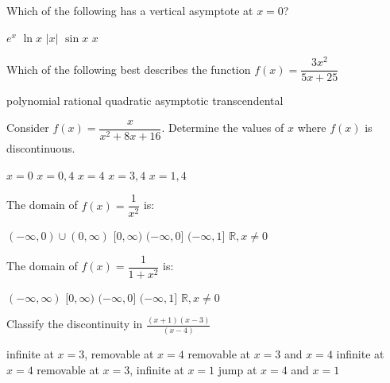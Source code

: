 \documentclass[legalpaper, 12pt, addpoints]{exam}
\begin{document}
\begin{questions}
\question Which of the following has a vertical asymptote at $x=0$? 
\begin{choices}
        \choice  $e^x$
        \CorrectChoice $\ln{x}$
        \choice $|x|$
        \choice $\sin{x}$
        \choice ${x}$
 \end{choices}
\vspace{0.1in}

\question Which of the following best describes the function $f(x) = \dfrac{3x^2}{5x+25}$
    \begin{choices}
         \choice polynomial
         \CorrectChoice rational
         \choice quadratic
         \choice asymptotic
         \choice transcendental
    \end{choices}
    
\vspace{0.10in}

\question Consider \(f(x) = \dfrac{x}{x^2+8x+16}\). 
Determine the values of $x$ where $f(x)$ is discontinuous.
 \begin{choices}
            \choice $x=0$
            \choice $x=0,4$
            \CorrectChoice $x=4$
            \choice $x=3,4$
            \choice $x=1,4$
 \end{choices}

\question The domain of $f(x) = \dfrac{1}{x^2}$ is:
    \begin{choices}
            \CorrectChoice $(-\infty,0) \cup (0, \infty)$
            \choice $[0, \infty)$
            \choice $(-\infty, 0]$
            \choice $(-\infty, 1]$
   \choice $\mathbb{R}, x \ne 0$

            \end{choices}
            
 \question The domain of $f(x) = \dfrac{1}{1+x^2}$ is:
 \begin{choices}
     \CorrectChoice $(-\infty, \infty)$
     \choice $[0, \infty)$
     \choice $(-\infty, 0]$
     \choice $(-\infty, 1]$
     \choice $\mathbb{R}, x \ne 0$
\end{choices}

\pagebreak
        
\question Classify the discontinuity in  $ \displaystyle \frac{(x+1)(x-3)}{(x-4)}$ 
\begin{choices}
        \choice infinite at $x=3$, removable at $x=4$
        \choice removable at $x=3$ and $x=4$
         \CorrectChoice  infinite at $x=4$
        \choice removable at $x=3$, infinite at $x=1$
        \choice jump at $x=4$ and $x=1$
\end{choices}
    \vspace{0.10in}
    

\end{questions}
\end{document}
